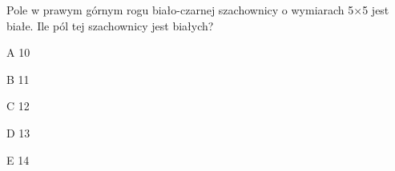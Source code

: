 \begin{tresc}
Pole w prawym górnym rogu biało-czarnej szachownicy o wymiarach 5×5 jest białe. Ile pól tej szachownicy jest białych?
\end{tresc}
\begin{wariant}{A} 10 \end{wariant}
\begin{wariant}{B} 11 \end{wariant}
\begin{wariant}{C} 12 \end{wariant}
\begin{wariant}{D} 13 \end{wariant}
\begin{wariant}{E} 14 \end{wariant}
